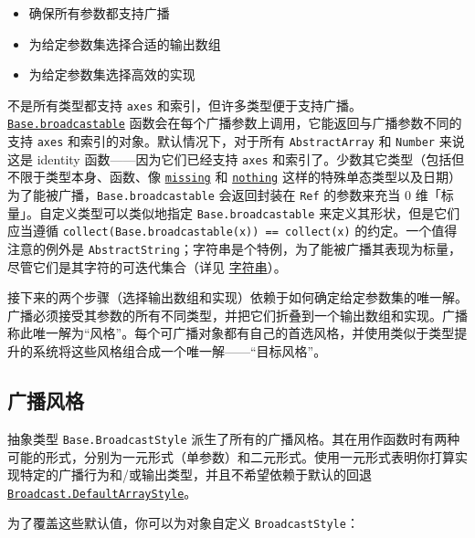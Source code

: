 \begin{itemize}
\item 确保所有参数都支持广播


\item 为给定参数集选择合适的输出数组


\item 为给定参数集选择高效的实现

\end{itemize}


不是所有类型都支持 \texttt{axes} 和索引，但许多类型便于支持广播。\hyperlink{3229213625072672556}{\texttt{Base.broadcastable}} 函数会在每个广播参数上调用，它能返回与广播参数不同的支持 \texttt{axes} 和索引的对象。默认情况下，对于所有 \texttt{AbstractArray} 和 \texttt{Number} 来说这是 identity 函数——因为它们已经支持 \texttt{axes} 和索引了。少数其它类型（包括但不限于类型本身、函数、像 \hyperlink{14596725676261444434}{\texttt{missing}} 和 \hyperlink{9331422207248206047}{\texttt{nothing}} 这样的特殊单态类型以及日期）为了能被广播，\texttt{Base.broadcastable} 会返回封装在 \texttt{Ref} 的参数来充当 0 维「标量」。自定义类型可以类似地指定 \texttt{Base.broadcastable} 来定义其形状，但是它们应当遵循 \texttt{collect(Base.broadcastable(x)) == collect(x)} 的约定。一个值得注意的例外是 \texttt{AbstractString}；字符串是个特例，为了能被广播其表现为标量，尽管它们是其字符的可迭代集合（详见 \href{@id man-strings}{字符串}）。



接下来的两个步骤（选择输出数组和实现）依赖于如何确定给定参数集的唯一解。广播必须接受其参数的所有不同类型，并把它们折叠到一个输出数组和实现。广播称此唯一解为“风格”。每个可广播对象都有自己的首选风格，并使用类似于类型提升的系统将这些风格组合成一个唯一解——“目标风格”。



\hypertarget{5448969838863032993}{}


\subsection{广播风格}



抽象类型 \texttt{Base.BroadcastStyle} 派生了所有的广播风格。其在用作函数时有两种可能的形式，分别为一元形式（单参数）和二元形式。使用一元形式表明你打算实现特定的广播行为和/或输出类型，并且不希望依赖于默认的回退 \hyperlink{5203521679854231580}{\texttt{Broadcast.DefaultArrayStyle}}。



为了覆盖这些默认值，你可以为对象自定义 \texttt{BroadcastStyle}：




